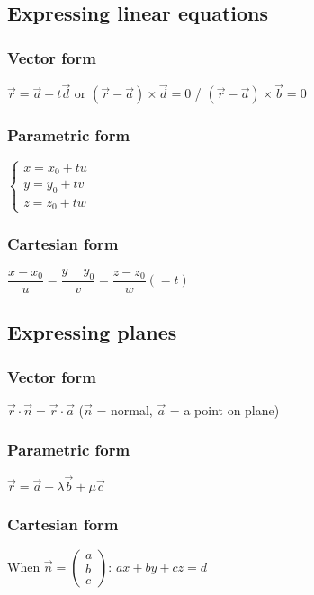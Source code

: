 \subsection{Expressing linear equations}

\subsubsection{Vector form}
$\vec{r}=\vec{a}+t\vec{d}$ or $(\vec{r}-\vec{a})\times\vec{d}=0$ / $(\vec{r}-\vec{a})\times\vec{b}=0$
\subsubsection{Parametric form}
$\begin{cases}
	x=x_0+tu\\
	y=y_0+tv\\
	z=z_0+tw
\end{cases}$
\subsubsection{Cartesian form}
$\dfrac{x-x_0}{u}=\dfrac{y-y_0}{v}=\dfrac{z-z_0}{w}(=t)$

\subsection{Expressing planes}
\subsubsection{Vector form}
$\vec{r} \cdot \vec{n} = \vec{r} \cdot \vec{a}$ ($\vec{n}$ = normal, $\vec{a}$ = a point on plane)
\subsubsection{Parametric form}
$\vec{r}=\vec{a}+\lambda\vec{b}+\mu\vec{c}$
\subsubsection{Cartesian form}
When $\vec{n} = \begin{pmatrix}a\\b\\c\end{pmatrix}$: $ax+by+cz=d$

